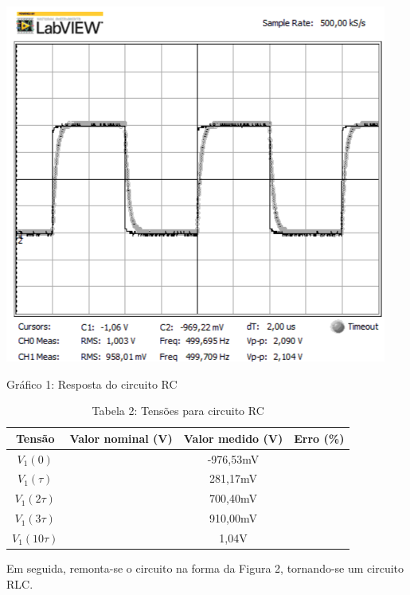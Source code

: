 \documentclass[a4 paper]{article}
\begin{document}


\begin{table}[h]
\centering
\includegraphics[scale=0.6]{rgadicoas/rgadicoa}
\end{table}

\begin{center}
Gráfico 1: Resposta do circuito RC
\end{center}



\vspace{5pt}
\begin{table}[h]
\centering
\begin{tabular}{|c|c|c|c|}
\hline
Tensão & Valor nominal (V) & Valor medido (V) & Erro (\%) \\\hline
$V_1(0)$ &  & -976,53mV & \\    \hline
$V_1(\tau)$ &  & 281,17mV & \\    \hline
$V_1(2\tau)$ &  & 700,40mV & \\\hline
$V_1(3\tau)$ &  & 910,00mV & \\\hline
$V_1(10\tau)$ &  & 1,04V & \\\hline
\end{tabular}
\caption*{Tabela 2: Tensões para circuito RC}
\end{table}




\newpage
Em seguida, remonta-se o circuito na forma da Figura 2, tornando-se um circuito RLC.
\end{document}

